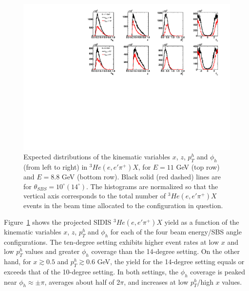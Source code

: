 \begin{figure}[h]
  \begin{center}
    \includegraphics[width=.98\textwidth]{figures/kine14deg10deg_comparison.pdf}
  \end{center}
  \caption{\label{kine14_10_1D} Expected distributions of the kinematic variables $x$, $z$, $p_T^h$ and $\phi_h$ (from left to right) in $^3He(e,e'\pi^+)X$, for $E = 11$ GeV (top row) and $E = 8.8$ GeV (bottom row). Black solid (red dashed) lines are for $\theta_{SBS} = 10^\circ (14^\circ)$. The histograms are normalized so that the vertical axis corresponds to the total number of $^3He(e,e'\pi^+)X$ events in the beam time allocated to the configuration in question.}
\end{figure}
Figure~\ref{kine14_10_1D} shows the projected SIDIS $^3He(e,e'\pi^+)X$ yield as a function of the kinematic variables $x$, $z$, $p_T^h$ and $\phi_h$ for each of the four beam energy/SBS angle configurations. The ten-degree setting exhibits higher event rates at low $x$ and low $p_T^h$ values and greater $\phi_h$ coverage than the 14-degree setting. On the other hand, for $x \gtrsim 0.5$ and $p_T^h \gtrsim 0.6$ GeV, the yield for the 14-degree setting equals or exceeds that of the 10-degree setting. In both settings, the $\phi_h$ coverage is peaked near $\phi_h \approx \pm \pi$, averages about half of 2$\pi$, and increases at low $p_T^h$/high $x$ values. 

